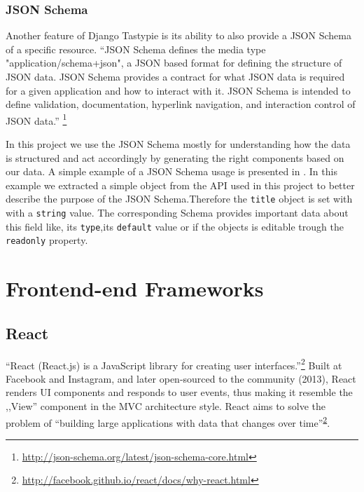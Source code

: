 \subsubsection{JSON Schema}
\label{sub-sub-sec:json-schema}

Another feature of Django Tastypie is its ability to also provide a JSON Schema of a specific resource. ``JSON Schema defines the media type "application/schema+json", a JSON based format for defining the structure of JSON data. JSON Schema provides a contract for what JSON data is required for a given application and how to interact with it. JSON Schema is intended to define validation, documentation, hyperlink navigation, and interaction control of JSON data.'' \footnote{\url{http://json-schema.org/latest/json-schema-core.html}}

In this project we use the JSON Schema mostly for understanding how the data is structured and act accordingly by generating the right components based on our data. A simple example of a JSON Schema usage is presented in . In this example we extracted a simple object from the API used in this project to better describe the purpose of the JSON Schema.Therefore the \texttt{title} object is set with with a \texttt{string} value. The corresponding Schema provides important data about this field like, its \texttt{type},its \texttt{default} value or if the objects is editable trough the \texttt{readonly} property.
\\


\section{Frontend-end Frameworks}
\label{sec:frontend}

\subsection{React}
\label{sub-sec:react}

``React (React.js) is a JavaScript library for creating user interfaces.''\footnote{\label{why-react}\url{http://facebook.github.io/react/docs/why-react.html}} Built at Facebook and Instagram, and later open-sourced to the community (2013), React renders UI components and responds to user events, thus making it resemble the ,,View'' component in the MVC architecture style. React aims to solve the problem of ``building large applications with data that changes over time''\textsuperscript{\ref{why-react}}.

